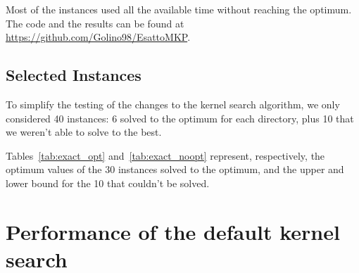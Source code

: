 Most of the instances used all the available time without reaching the optimum.
The code and the results can be found at \url{https://github.com/Golino98/EsattoMKP}.

\subsection{Selected Instances}\label{subsec:inst}
To simplify the testing of the changes to the kernel search algorithm,
we only considered 40 instances: 6 solved to the optimum for each directory,
plus 10 that we weren't able to solve to the best.

Tables~\ref{tab:exact_opt} and~\ref{tab:exact_noopt} represent,
respectively, the optimum values of the 30 instances solved to
the optimum, and the upper and lower bound for the 10
that couldn't be solved.





\section{Performance of the default kernel search}
